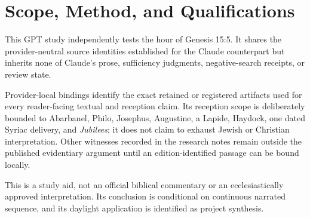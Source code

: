 \section{Scope, Method, and Qualifications}

This GPT study independently tests the hour of Genesis 15:5. It shares the
provider-neutral source identities established for the Claude counterpart but
inherits none of Claude's prose, sufficiency judgments, negative-search
receipts, or review state.

Provider-local bindings identify the exact retained or registered artifacts
used for every reader-facing textual and reception claim. Its reception scope
is deliberately bounded to Abarbanel, Philo, Josephus, Augustine, a Lapide,
Haydock, one dated Syriac delivery, and \emph{Jubilees}; it does not claim to
exhaust Jewish or Christian interpretation. Other witnesses recorded in the
research notes remain outside the published evidentiary argument until an
edition-identified passage can be bound locally.

This is a study aid, not an official biblical commentary or an
ecclesiastically approved interpretation. Its conclusion is conditional on
continuous narrated sequence, and its daylight application is identified as
project synthesis.

